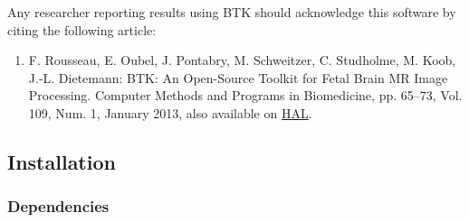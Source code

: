 \documentclass[a4paper,10pt]{article}
\begin{document}
  Any researcher reporting results using BTK should acknowledge this software by citing the following article:
  \begin{enumerate}
 \item F. Rousseau, E. Oubel, J. Pontabry, M. Schweitzer, C. Studholme, M. Koob, J.-L. Dietemann: BTK: An Open-Source Toolkit for Fetal Brain MR Image Processing. Computer Methods and Programs in Biomedicine, pp. 65--73, Vol. 109, Num. 1, January 2013, also available on \href{http://hal.archives-ouvertes.fr/index.php?halsid=d0mrvug09qhhou49vgaqc6ogd3&view_this_doc=hal-00671183&version=1}{HAL}.
  \end{enumerate}

  \subsection{Installation}

  \subsubsection{Dependencies}
\end{document}
